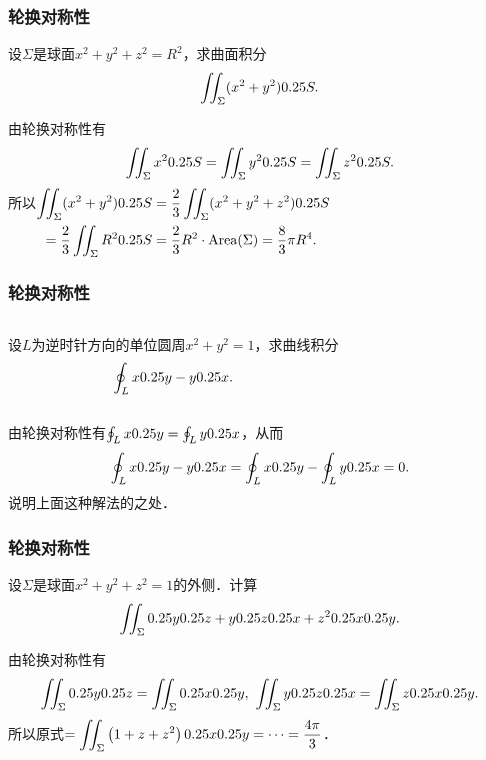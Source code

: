 \documentclass[14pt,notheorems,leqno,xcolor={rgb}]{beamer} %
\begin{document}
\begin{frame}
\frametitle{轮换对称性}
\begin{example}
设$\Sigma$是球面$x^2+y^2+z^2=R^2$，求曲面积分
$$\iint_{\Sigma}(x^{2}+y^{2})0.25 S.$$
\end{example}
\pause
\begin{method*}
由轮换对称性有
$$\iint_{\Sigma}x^{2}0.25 S=\iint_{\Sigma}y^{2}0.25 S=\iint_{\Sigma}z^{2}0.25 S.$$\pause
所以$\begin{aligned}[t]
\iint_{\Sigma}(x^2+y^2)\dS
&=\frac{2}{3}\iint_{\Sigma}(x^{2}+y^{2}+z^{2})\dS \\
 =\frac{2}{3}\iint_{\Sigma}R^{2}\dS
&=\frac{2}{3}R^{2}\cdot\text{Area}(\Sigma) %
 =\frac{8}{3}\pi R^4.
\end{aligned}$
\end{method*}
\end{frame}

\begin{frame}
\frametitle{轮换对称性}
\begin{columns}[onlytextwidth]
\begin{example}
设$L$为逆时针方向的单位圆周$x^2+y^2=1$，求曲线积分
$$\oint_{L}x0.25 y-y0.25 x.$$
\end{example}
\hfill{}
\end{columns}
\pause
\begin{method*}
由轮换对称性有$\oint_{L}x0.25 y=\oint_{L}y0.25 x$，从而
$$\oint_{L}x0.25 y-y0.25 x=\oint_{L}x0.25 y-\oint_{L}y0.25 x=0.$$
说明上面这种解法的之处．
\end{method*}
\end{frame}

\begin{frame}
\frametitle{轮换对称性}
\begin{example}
设$\Sigma$是球面$x^2+y^2+z^2=1$的外侧．计算
$$\iint_{\Sigma}0.25 y0.25 z+y0.25 z0.25 x+z^20.25 x0.25 y.$$
\end{example}
\pause
\begin{method*}
由轮换对称性有
\[\iint_{\Sigma}0.25 y0.25 z=\iint_{\Sigma}0.25 x0.25 y,\
  \iint_{\Sigma}y0.25 z0.25 x=\iint_{\Sigma}z0.25 x0.25 y.\]
所以原式$\displaystyle=\iint_{\Sigma}\left(1+z+z^2\right)0.25 x0.25 y=\cdots=\frac{4\pi}{3}$．
\end{method*}
\end{frame}
\end{document}
